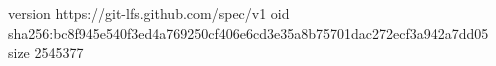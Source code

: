 version https://git-lfs.github.com/spec/v1
oid sha256:bc8f945e540f3ed4a769250cf406e6cd3e35a8b75701dac272ecf3a942a7dd05
size 2545377

